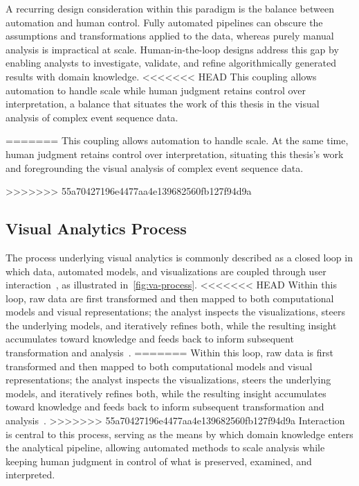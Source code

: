 A recurring design consideration within this paradigm is the balance between automation and human control.
Fully automated pipelines can obscure the assumptions and transformations applied to the data, whereas purely manual analysis is impractical at scale.
Human-in-the-loop designs address this gap by enabling analysts to investigate, validate, and refine algorithmically generated results with domain knowledge.
<<<<<<< HEAD
This coupling allows automation to handle scale while human judgment retains control over interpretation, a balance that situates the work of this thesis in the visual analysis of complex event sequence data.



=======
This coupling allows automation to handle scale. 
At the same time, human judgment retains control over interpretation, situating this thesis's work and foregrounding the visual analysis of complex event sequence data.



>>>>>>> 55a70427196e4477aa4e139682560fb127f94d9a
\subsection{Visual Analytics Process}
\label{subsec:rw-va-process}
The process underlying visual analytics is commonly described as a closed loop in which data, automated models, and visualizations are coupled through user interaction~\cite{keim2008visual}, as illustrated in~\cref{fig:va-process}.
<<<<<<< HEAD
Within this loop, raw data are first transformed and then mapped to both computational models and visual representations; the analyst inspects the visualizations, steers the underlying models, and iteratively refines both, while the resulting insight accumulates toward knowledge and feeds back to inform subsequent transformation and analysis~\cite{keim2008visual}.
=======
Within this loop, raw data is first transformed and then mapped to both computational models and visual representations; the analyst inspects the visualizations, steers the underlying models, and iteratively refines both, while the resulting insight accumulates toward knowledge and feeds back to inform subsequent transformation and analysis~\cite{keim2008visual}.
>>>>>>> 55a70427196e4477aa4e139682560fb127f94d9a
Interaction is central to this process, serving as the means by which domain knowledge enters the analytical pipeline, allowing automated methods to scale analysis while keeping human judgment in control of what is preserved, examined, and interpreted.


